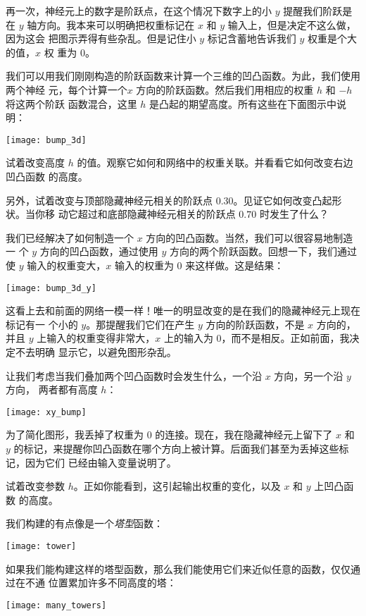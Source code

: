 再一次，神经元上的数字是阶跃点，在这个情况下数字上的小 $y$ 提醒我们阶跃是在 $y$
轴方向。我本来可以明确把权重标记在 $x$ 和 $y$ 输入上，但是决定不这么做，因为这会
把图示弄得有些杂乱。但是记住小 $y$ 标记含蓄地告诉我们 $y$ 权重是个大的值，$x$ 权
重为 $0$。

我们可以用我们刚刚构造的阶跃函数来计算一个三维的凹凸函数。为此，我们使用两个神经
元，每个计算一个$x$ 方向的阶跃函数。然后我们用相应的权重 $h$ 和 $-h$ 将这两个阶跃
函数混合，这里 $h$ 是凸起的期望高度。所有这些在下面图示中说明：
\begin{center}
  \texttt{[image: bump\_3d]}
\end{center}

试着改变高度 $h$ 的值。观察它如何和网络中的权重关联。并看看它如何改变右边凹凸函数
的高度。

另外，试着改变与顶部隐藏神经元相关的阶跃点 $0.30$。见证它如何改变凸起形状。当你移
动它超过和底部隐藏神经元相关的阶跃点 $0.70$ 时发生了什么？

我们已经解决了如何制造一个 $x$ 方向的凹凸函数。当然，我们可以很容易地制造一
个 $y$ 方向的凹凸函数，通过使用 $y$ 方向的两个阶跃函数。回想一下，我们通过使 $y$
输入的权重变大，$x$ 输入的权重为 $0$ 来这样做。这是结果：
\begin{center}
  \texttt{[image: bump\_3d\_y]}
\end{center}

这看上去和前面的网络一模一样！唯一的明显改变的是在我们的隐藏神经元上现在标记有一
个小的 $y$。那提醒我们它们在产生 $y$ 方向的阶跃函数，不是 $x$ 方向的，并且 $y$
上输入的权重变得非常大，$x$ 上的输入为 $0$，而不是相反。正如前面，我决定不去明确
显示它，以避免图形杂乱。

让我们考虑当我们叠加两个凹凸函数时会发生什么，一个沿 $x$ 方向，另一个沿 $y$ 方向，
两者都有高度 $h$：
\begin{center}
  \texttt{[image: xy\_bump]}
\end{center}

为了简化图形，我丢掉了权重为 $0$ 的连接。现在，我在隐藏神经元上留下了 $x$ 和 $y$
的标记，来提醒你凹凸函数在哪个方向上被计算。后面我们甚至为丢掉这些标记，因为它们
已经由输入变量说明了。

试着改变参数 $h$。正如你能看到，这引起输出权重的变化，以及 $x$ 和 $y$ 上凹凸函数
的高度。

我们构建的有点像是一个\emph{塔型}函数：
\begin{center}
  \texttt{[image: tower]}
\end{center}

如果我们能构建这样的塔型函数，那么我们能使用它们来近似任意的函数，仅仅通过在不通
位置累加许多不同高度的塔：
\begin{center}
  \texttt{[image: many\_towers]}
\end{center}

